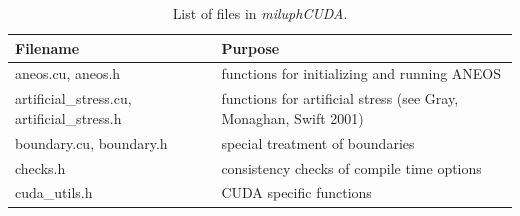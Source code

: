 \documentclass[10pt,fleqn,twoside]{article}
\begin{document}
\begin{table}
 \centering
 \caption{List of files in \emph{miluphCUDA}.}
 \small
 \begin{tabular}[b]{p{6cm} p{9cm}}
  \hline
  Filename                                                      & Purpose                                                                                                                                                                                                                                                                                                                                                    \\
  \hline
  aneos.cu, aneos.h                                             & functions for initializing and running ANEOS                                                                                                                                                                                                                                                                                                               \\
  artificial\_stress.cu, artificial\_stress.h                   & functions for artificial stress (see Gray, Monaghan, Swift 2001)                                                                                                                                                                                                                                                                                           \\
  boundary.cu, boundary.h                                       & special treatment of boundaries                                                                                                                                                                                                                                                                                                                            \\
  checks.h                                                      & consistency checks of compile time options                                                                                                                                                                                                                                                                                                                 \\
  cuda\_utils.h                                                 & CUDA specific functions                                                                                                                                                                                                                                                                                                                                    \\

\end{tabular}
\end{table}
\end{document}
